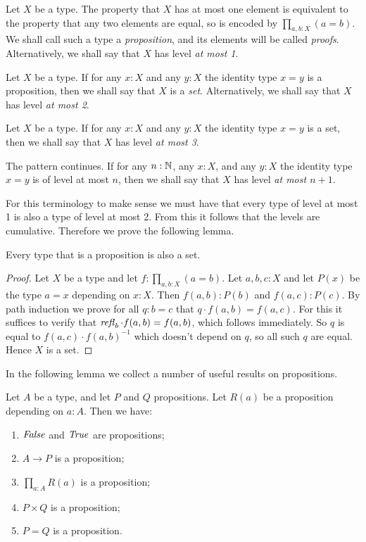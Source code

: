 Let $X$ be a type.  The property that $X$ has at most one element is equivalent to the property that any two elements are equal, so is encoded
by $\prod_{a,b:X} (a=b)$.  We shall call such a type a {\em proposition}, and its elements will be called {\em proofs}.
Alternatively, we shall say that $X$ has level {\em at most 1}.

Let $X$ be a type.  If for any $x:X$ and any $y:X$ the identity type $x=y$ is a proposition, then we shall say that $X$ is a {\em set}.
Alternatively, we shall say that $X$ has level {\em at most 2}.

Let $X$ be a type.  If for any $x:X$ and any $y:X$ the identity type $x=y$ is a set, then we shall say that $X$ has level {\em at most 3}.

The pattern continues.  If for any $n:\mathbb{N}$, any $x:X$, and any $y:X$ the identity type $x=y$ is of level at most $n$, then we shall say that $X$
has level {\em at most $n+1$}.

For this terminology to make sense we must have that every type of level
at most 1 is also a type of level at most 2. From this it follows
that the levels are cumulative. Therefore we prove the following lemma.

\begin{lemma}\label{lem:prop_is_set}
Every type that is a proposition is also a set.
\end{lemma}
\begin{proof}
Let $X$ be a type and let $f: \prod_{a,b:X} (a=b)$. Let $a,b,c : X$ and
let $P(x)$ be the type $a=x$ depending on $x:X$. Then
$f(a,b):P(b)$ and $f(a,c):P(c)$. By path induction we prove for
all $q:b=c$ that $q\cdot f(a,b) = f(a,c)$. For this it suffices to
verify that $\mathop{{\it refl}_{b}} \cdot f(a,b) = f(a,b)$, which follows immediately.
So $q$ is equal to $f(a,c)\cdot f(a,b)^{-1}$ which doesn't
depend on $q$, so all such $q$ are equal. Hence $X$ is a set.
\end{proof}

In the following lemma we collect a number of useful results on propositions.

\begin{lemma}\label{lem:prop_utils}
Let $A$ be a type, and let $P$ and $Q$ propositions.
Let $R(a)$ be a proposition depending on $a:A$. Then we have:
\begin{enumerate}
\item\label{prop_utils_false_true} $\mathop{\mathit{False}}$ and $\mathop{\mathit{True}}$ are propositions;
\item\label{prop_utils_implication} $A\to P$ is a proposition;
\item\label{prop_utils_pi} $\prod_{a:A} R(a)$ is a proposition;
\item\label{prop_utils_times} $P\times Q$ is a proposition;
\item\label{prop_utils_eq} $P = Q$ is a proposition.
\end{enumerate}
\end{lemma}

